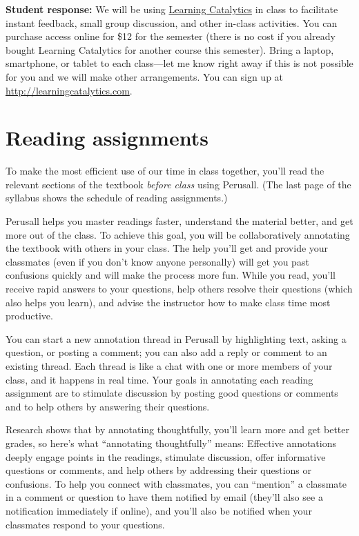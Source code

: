 \documentclass[12pt]{article}
\begin{document}
\textbf{Student response:} We will be using \href{http://learningcatalytics.com}{Learning Catalytics} in class to facilitate instant feedback, small group discussion, and other in-class activities.  You can purchase access online for \$12 for the semester (there is no cost if you already bought Learning Catalytics for another course this semester).  Bring a laptop, smartphone, or tablet to each class---let me know right away if this is not possible for you and we will make other arrangements. You can sign up at \url{http://learningcatalytics.com}.

\section*{Reading assignments}

To make the most efficient use of our time in class together, you'll read the relevant sections of the textbook \emph{before class} using Perusall. (The last page of the syllabus shows the schedule of reading assignments.)

Perusall helps you master readings faster, understand the material better, and get more out of the class. To achieve this goal, you will be collaboratively annotating the textbook with others in your class. The help you'll get and provide your classmates (even if you don't know anyone personally) will get you past confusions quickly and will make the process more fun. While you read, you'll receive rapid answers to your questions, help others resolve their questions (which also helps you learn), and advise the instructor how to make class time most productive. 

You can start a new annotation thread in Perusall by highlighting text, asking a question, or posting a comment; you can also add a reply or comment to an existing thread. Each thread is like a chat with one or more members of your class, and it happens in real time. Your goals in annotating each reading assignment are to stimulate discussion by posting good questions or comments and to help others by answering their questions.

Research shows that by annotating thoughtfully, you’ll learn more and get better grades, so here’s what ``annotating thoughtfully'' means: Effective annotations deeply engage points in the readings, stimulate discussion, offer informative questions or comments, and help others by addressing their questions or confusions. To help you connect with classmates, you can ``mention'' a classmate in a comment or question to have them notified by email (they’ll also see a notification immediately if online), and you’ll also be notified when your classmates respond to your questions. 
\end{document}
